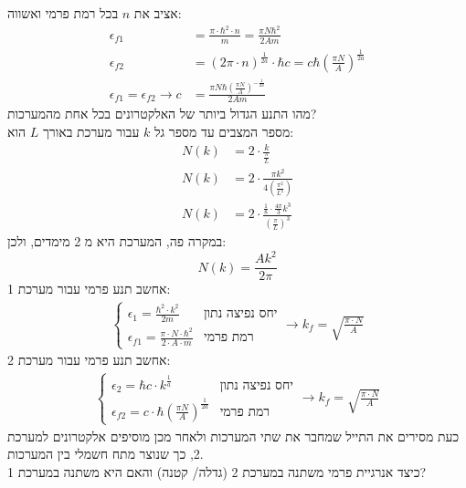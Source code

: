 \documentclass{article}
\begin{document}
\begin{Question}
אציב את $n$ בכל רמת פרמי ואשווה:
\begin{align*}
    \epsilon_{f1}&=\frac{\pi\cdot \hbar^{2}\cdot n}{m} = \frac{\pi N \hbar^{2}}{2 A m}\\
    \epsilon_{f2}&=\left( 2\pi\cdot n \right)^{\frac{1}{2a}}\cdot\hbar c=c \hbar \left(\frac{\pi N}{A}\right)^{\frac{1}{2 a}}\\
    \epsilon_{f1}=\epsilon_{f2}\rightarrow c&=\frac{\pi N \hbar (\frac{\pi N}{A})^{- \frac{1}{2 a}}}{2 A m}
\end{align*}
מהו התנע הגדול ביותר של האלקטרונים בכל אחת מהמערכות?\\
מספר המצבים עד מספר גל $k$ עבור מערכת באורך $L$ הוא:
\begin{align*}
    N\left( k \right)&=2\cdot\frac{k}{\frac{\pi}{L}}\tag{1d}\\
    N\left( k \right)&=2\cdot\frac{\pi k^{2}}{4\left( \frac{\pi^2}{L^{2}} \right)}\tag{2d}\\
    N\left( k \right)&=2\cdot\frac{\frac{1}{8}\cdot\frac{4\pi}{3}k^{3}}{\left( \frac{\pi}{L} \right)^{3}}\tag{3d}
\end{align*}
במקרה פה, המערכת היא מ 2 מימדים, ולכן:
$$N\left( k \right)=\frac{A k^{2}}{2\pi}$$
אחשב תנע פרמי עבור מערכת 1:
\begin{align*}
    \begin{cases}
        \epsilon_{1}=\frac{\hbar^{2}\cdot k^{2}}{2m}&\text{יחס נפיצה נתון}\\
        \epsilon_{f1}=\frac{\pi\cdot N\cdot\hbar^{2}}{2\cdot A\cdot m}&\text{רמת פרמי}
    \end{cases}\rightarrow k_{f}=\sqrt{\frac{\pi\cdot N}{A}}
\end{align*}
אחשב תנע פרמי עבור מערכת 2:
\begin{align*}
    \begin{cases}
        \epsilon_{{2}}=\hbar c\cdot k^{\frac{1}{a}}&\text{יחס נפיצה נתון}\\
        \epsilon_{{f2}}=c\cdot\hbar\left( \frac{\pi N}{A} \right)^{\frac{1}{2a}}&\text{רמת פרמי}
    \end{cases}\rightarrow k_{f}=\sqrt{\frac{\pi\cdot N}{A}}
\end{align*}
כעת מסירים את התייל שמחבר את שתי המערכות ולאחר מכן מוסיפים אלקטרונים למערכת 2, כך שנוצר מתח חשמלי בין המערכות.\\ כיצד אנרגיית פרמי משתנה במערכת 2 (גדלה/ קטנה) והאם היא משתנה במערכת 1?\\

\end{Question}
\end{document}
